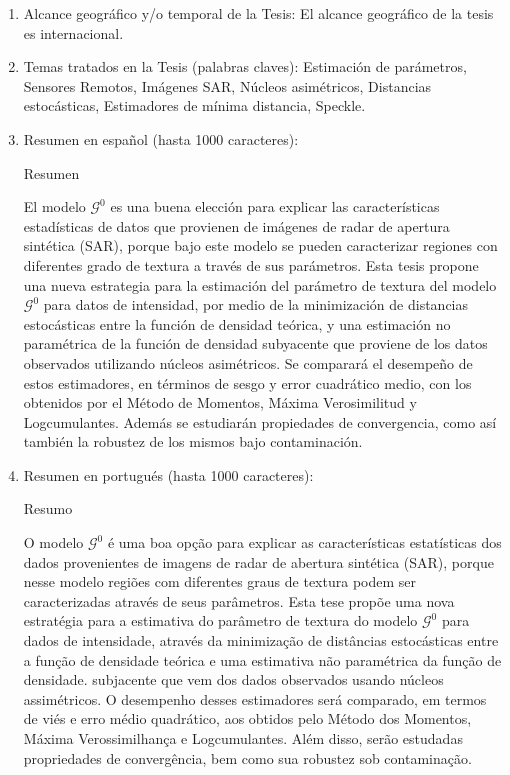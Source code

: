 \begin{enumerate}
	\item Alcance geográfico y/o temporal de la Tesis: El alcance geográfico de la tesis es internacional.
	
	\item Temas tratados en la Tesis (palabras claves): Estimación de parámetros, Sensores Remotos, Imágenes SAR, Núcleos asimétricos, Distancias estocásticas, Estimadores de mínima distancia, Speckle.
	
	\item Resumen en español (hasta 1000 caracteres): 
	
	Resumen
	
	El modelo $\mathcal{G}^0$ es una buena elección para explicar las características estadísticas de datos que provienen de imágenes de radar de apertura sintética (SAR), porque bajo este modelo se pueden caracterizar regiones con diferentes grado de textura a través de sus parámetros.  Esta tesis propone una nueva estrategia para la estimación del parámetro de textura del modelo $\mathcal G^0$ para datos de intensidad, por medio de la minimización de distancias estocásticas entre la función de densidad teórica, y una estimación no paramétrica de la función de densidad subyacente que proviene de los datos observados utilizando núcleos asimétricos. Se comparará el desempeño de estos estimadores, en términos de sesgo y error cuadrático medio, con los obtenidos por el Método de Momentos, Máxima Verosimilitud y Logcumulantes. Además se estudiarán propiedades de convergencia, como así también la robustez de los mismos bajo contaminación. 
	
	
	\item Resumen en portugués (hasta 1000 caracteres):
	
	Resumo
	
	O modelo $ \mathcal {G}^0$ é uma boa opção para explicar as características estatísticas dos dados provenientes de imagens de radar de abertura sintética (SAR), porque nesse modelo regiões com diferentes graus de textura podem ser caracterizadas através de seus parâmetros. Esta tese propõe uma nova estratégia para a estimativa do parâmetro de textura do modelo $\mathcal{G}^0$ para dados de intensidade, através da minimização de distâncias estocásticas entre a função de densidade teórica e uma estimativa não paramétrica da função de densidade. subjacente que vem dos dados observados usando núcleos assimétricos. O desempenho desses estimadores será comparado, em termos de viés e erro médio quadrático, aos obtidos pelo Método dos Momentos, Máxima Verossimilhança e Logcumulantes. Além disso, serão estudadas propriedades de convergência, bem como sua robustez sob contaminação.
	

\end{enumerate}
